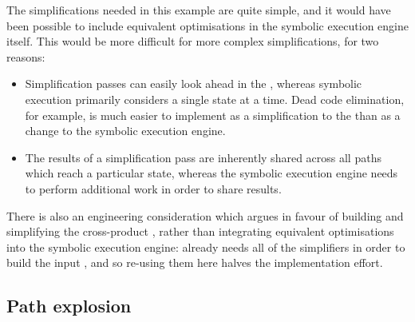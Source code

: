 The simplifications needed in this example are quite simple, and it
would have been possible to include equivalent optimisations in the
symbolic execution engine itself.  This would be more difficult for
more complex simplifications, for two reasons:
\begin{itemize}
\item Simplification passes can easily look ahead in the
  {\StateMachine}, whereas symbolic execution primarily considers a
  single state at a time.  Dead code elimination, for example, is much
  easier to implement as a simplification to the {\StateMachine} than
  as a change to the symbolic execution engine.
\item The results of a simplification pass are inherently shared
  across all paths which reach a particular state, whereas the
  symbolic execution engine needs to perform additional work in order
  to share results.
\end{itemize}
There is also an engineering consideration which argues in favour of
building and simplifying the cross-product {\StateMachine}, rather
than integrating equivalent optimisations into the symbolic execution
engine: {\implementation} already needs all of the simplifiers in
order to build the input {\StateMachines}, and so re-using them here
halves the implementation effort.


\subsection{Path explosion}

